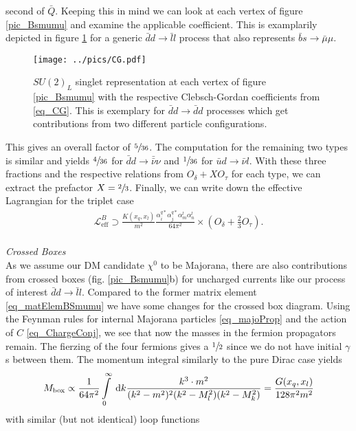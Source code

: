 second of $\bar Q$. Keeping this in mind we can look at each vertex of figure \ref{pic_Bsmumu} and examine the applicable coefficient. This is examplarily
depicted in figure \ref{pic_CG} for a generic $\bar d d\rightarrow \bar l l$ process that also represents $\bar b s \rightarrow \bar \mu \mu$.
\begin{figure}[t]
 \texttt{[image: ../pics/CG.pdf]}
 \caption{$SU(2)_L$ singlet representation at each vertex of figure \ref{pic_Bsmumu} with the respective Clebsch-Gordan coefficients from \eqref{eq_CG}. 
 This is exemplary for $\bar d d\rightarrow \bar d d$ processes which get contributions from two different particle configurations.}
 \label{pic_CG}
\end{figure}
This gives an overall factor of $\sfrac{5}{36}$. The computation for the remaining two types is similar and yields $\sfrac{4}{36}$ for 
$\bar d d\rightarrow \bar \bar \nu \nu$ and $\sfrac{1}{36}$ for $\bar u d \rightarrow \bar \nu l$. With these three fractions and the respective relations from 
$O_\delta + X O_\tau$ for each type, we can extract the prefactor $X=\sfrac23$. Finally, we can write down the effective Lagrangian for the 
triplet case
\begin{align}
 \mathcal{L}^B_\text{eff} \supset \frac{K(x_q,x_l)}{m^2}\frac{\alpha_i^{q*} \alpha_j^{q*} \alpha_m^l \alpha_n^l}{64\pi^2}\times\left(O_\delta + \frac23 O_\tau\right).
 \label{eq_LagBSmumuModB}
\end{align}
\\ \textit{Crossed Boxes}\\
\noindent As we assume our DM candidate $\chi^0$ to be Majorana, there are also contributions from crossed boxes (fig. \ref{pic_Bsmumu}b) for uncharged
currents like our process of interest $\bar d d\rightarrow \bar l l$. Compared to the former matrix element \eqref{eq_matElemBSmumu} we have some changes
for the crossed box diagram. Using the Feynman rules for internal Majorana particles \eqref{eq_majoProp} and the action of $C$ \eqref{eq_ChargeConj}, 
we see that now the masses in the fermion propagators remain. The fierzing of the four fermions gives a $\sfrac12$ since we do not have initial $\gamma$s
between them. The momentum integral similarly to the pure Dirac case yields
\begin{align}
 M_\text{box} \propto \frac{1}{64 \pi^2}\int\limits_0^\infty \; \mathrm{d} k \frac{k^3 \cdot m^2}{(k^2-m^2)^2(k^2-M_l^2)(k^2-M_k^2)} = \frac{G(x_q,x_l)}{128\pi^2m^2}
 \label{eq_crossedBox}
\end{align}
with similar (but not identical) loop functions
